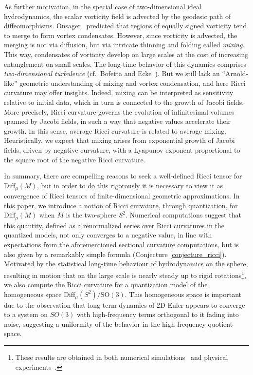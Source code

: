 \documentclass[11pt]{amsart}
\numberwithin{equation}{section}
\theoremstyle{definition}
\begin{document}
As further motivation, in the special case of two-dimensional ideal hydrodynamics, the scalar vorticity field is advected by the geodesic path of diffeomorphisms.
Onsager~\cite{On1949} predicted that regions of equally signed vorticity tend to merge to form vortex condensates.
However, since vorticity is advected, the merging is not via diffusion, but via intricate thinning and folding called \emph{mixing}.
This way, condensates of vorticity develop on large scales at the cost of increasing entanglement on small scales.
The long-time behavior of this dynamics comprises \emph{two-dimensional turbulence} (cf.~Bofetta and Ecke~\cite{BoEc2012}).
But we still lack an ``Arnold-like'' geometric understanding of mixing and vortex condensation, and here Ricci curvature may offer insights.
Indeed, mixing can be interpreted as sensitivity relative to initial data, which in turn is connected to the growth of Jacobi fields. 
More precisely, Ricci curvature governs the evolution of infinitesimal volumes spanned by Jacobi fields, in such a way that negative values accelerate their growth.
In this sense, average Ricci curvature is related to average mixing. Heuristically, we expect that mixing arises from exponential growth of Jacobi fields, driven by negative curvature, with a Lyapunov exponent proportional to the square root of the negative Ricci curvature.

In summary, there are compelling reasons to seek a well-defined Ricci tensor for $\mathrm{Diff}_\mu(M)$, but in order to do this rigorously it is necessary to view it as convergence of Ricci tensors of finite-dimensional geometric approximations.
In this paper, we introduce a notion of Ricci curvature, through quantization, for $\mathrm{Diff}_{\mu}(M)$ when $M$ is the two-sphere $S^2$. Numerical computations suggest that this quantity, defined as a renormalized series over Ricci curvatures in the quantized models, not only converges to a negative value, in line with expectations from the aforementioned sectional curvature computations, but is also given by a remarkably simple formula (Conjecture \ref{conjecture_ricci}). 
Motivated by the statistical long-time behaviour of hydrodynamics on the sphere, resulting in motion that on the large scale is nearly steady up to rigid rotations\footnote{These results are obtained in both numerical simulations~\cite{DrQiMa2015,MoVi2020} and physical experiments~\cite{Co1984}.}, we also compute the Ricci curvature for a quantization model of the homogeneous space $\mathrm{Diff}_\mu(S^2)/\mathrm{SO}(3)$. This homogeneous space is important due to the observation that long-term dynamics of 2D Euler appears to converge to a system on $SO(3)$ with high-frequency terms orthogonal to it fading into noise, suggesting a uniformity of the behavior in the high-frequency quotient space.
\end{document}

